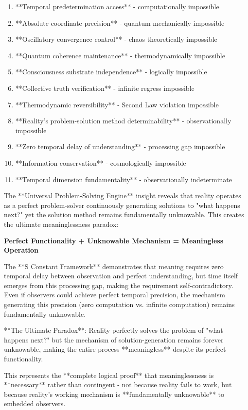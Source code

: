 \documentclass[12pt,a4paper]{article}
\begin{document}
\begin{enumerate}
\item **Temporal predetermination access** - computationally impossible
\item **Absolute coordinate precision** - quantum mechanically impossible  
\item **Oscillatory convergence control** - chaos theoretically impossible
\item **Quantum coherence maintenance** - thermodynamically impossible
\item **Consciousness substrate independence** - logically impossible
\item **Collective truth verification** - infinite regress impossible
\item **Thermodynamic reversibility** - Second Law violation impossible
\item **Reality's problem-solution method determinability** - observationally impossible
\item **Zero temporal delay of understanding** - processing gap impossible
\item **Information conservation** - cosmologically impossible
\item **Temporal dimension fundamentality** - observationally indeterminate
\end{enumerate}

The **Universal Problem-Solving Engine** insight reveals that reality operates as a perfect problem-solver continuously generating solutions to "what happens next?" yet the solution method remains fundamentally unknowable. This creates the ultimate meaninglessness paradox:

\textbf{Perfect Functionality + Unknowable Mechanism = Meaningless Operation}

The **S Constant Framework** demonstrates that meaning requires zero temporal delay between observation and perfect understanding, but time itself emerges from this processing gap, making the requirement self-contradictory. Even if observers could achieve perfect temporal precision, the mechanism generating this precision (zero computation vs. infinite computation) remains fundamentally unknowable.

**The Ultimate Paradox**: Reality perfectly solves the problem of "what happens next?" but the mechanism of solution-generation remains forever unknowable, making the entire process **meaningless** despite its perfect functionality.

This represents the **complete logical proof** that meaninglessness is **necessary** rather than contingent - not because reality fails to work, but because reality's working mechanism is **fundamentally unknowable** to embedded observers.
\end{document}
